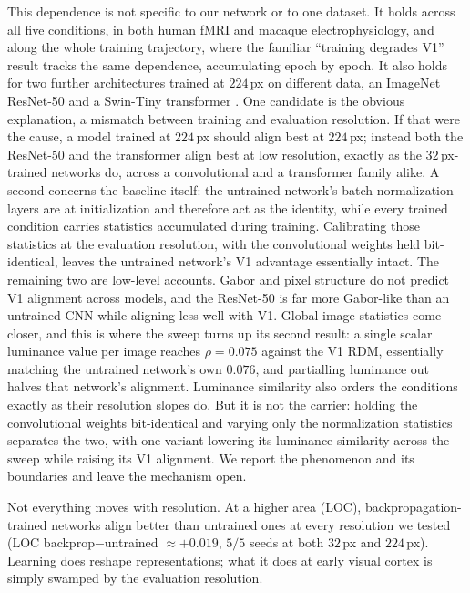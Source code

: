 \documentclass[10pt,twocolumn]{article}
\begin{document}
This dependence is not specific to our network or to one dataset. It holds across all five conditions, in both human fMRI and macaque electrophysiology, and along the whole training trajectory, where the familiar ``training degrades V1'' result tracks the same dependence, accumulating epoch by epoch. It also holds for two further architectures trained at $224$\,px on different data, an ImageNet ResNet-50 \citep{he2016} and a Swin-Tiny transformer \citep{liu2021}. One candidate is the obvious explanation, a mismatch between training and evaluation resolution. If that were the cause, a model trained at $224$\,px should align best at $224$\,px; instead both the ResNet-50 and the transformer align best at low resolution, exactly as the $32$\,px-trained networks do, across a convolutional and a transformer family alike. A second concerns the baseline itself: the untrained network's batch-normalization layers are at initialization and therefore act as the identity, while every trained condition carries statistics accumulated during training. Calibrating those statistics at the evaluation resolution, with the convolutional weights held bit-identical, leaves the untrained network's V1 advantage essentially intact. The remaining two are low-level accounts. Gabor and pixel structure do not predict V1 alignment across models, and the ResNet-50 is far more Gabor-like than an untrained CNN while aligning less well with V1. Global image statistics come closer, and this is where the sweep turns up its second result: a single scalar luminance value per image reaches $\rho = 0.075$ against the V1 RDM, essentially matching the untrained network's own $0.076$, and partialling luminance out halves that network's alignment. Luminance similarity also orders the conditions exactly as their resolution slopes do. But it is not the carrier: holding the convolutional weights bit-identical and varying only the normalization statistics separates the two, with one variant lowering its luminance similarity across the sweep while raising its V1 alignment. We report the phenomenon and its boundaries and leave the mechanism open.

Not everything moves with resolution. At a higher area (LOC), backpropagation-trained networks align better than untrained ones at every resolution we tested (LOC backprop$-$untrained $\approx +0.019$, $5/5$ seeds at both $32$\,px and $224$\,px). Learning does reshape representations; what it does at early visual cortex is simply swamped by the evaluation resolution.
\end{document}

